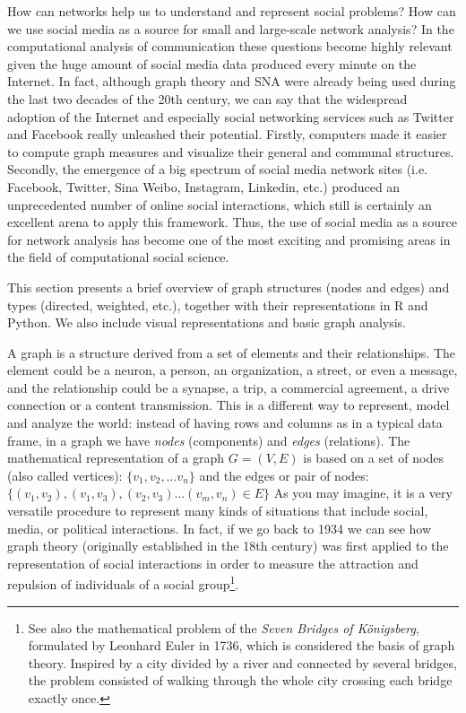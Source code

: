How can networks help us to understand and represent social problems? How can we use social media as a source for small and large-scale network analysis? In the computational analysis of communication these questions become highly relevant given the huge amount of social media data produced every minute on the Internet.  In fact, although graph theory and SNA were already being used during the last two decades of the 20th century, we can say that the widespread adoption of the Internet and especially social networking services such as Twitter and Facebook really unleashed their potential. Firstly, computers made it easier to compute graph measures and visualize their general and communal structures. Secondly, the emergence of a big spectrum of social media network sites (i.e. Facebook, Twitter, Sina Weibo, Instagram, Linkedin, etc.) produced an unprecedented number of online social interactions, which still is certainly an excellent arena to apply this framework. Thus, the use of social media as a source for network analysis has become one of the most exciting and promising areas in the field of computational social science.

This section presents a brief overview of graph structures (nodes and edges) and types (directed, weighted, etc.), together with their representations in R and Python. We also include visual representations and basic graph analysis.

A graph is a structure derived from a set of elements and their relationships. The element could be a neuron, a person, an organization, a street, or even a message, and the relationship could be a synapse, a trip, a commercial agreement, a drive connection or a content transmission. This is a different way to represent, model and analyze the world: instead of having rows and columns as in a typical data frame, in a graph we have \emph{nodes} (components) and \emph{edges} (relations).
The mathematical representation of a graph $G=(V,E)$ is based on a set of nodes (also called vertices): $\{v_{1}, v_{2},\ldots v_{n}\}$ and the edges or pair of nodes: $\{(v_{1}, v_{2}), (v_{1}, v_{3}), (v_{2},v_{3}) \ldots (v_{m}, v_{n}) \in E\}$ As you may imagine, it is a very versatile procedure to represent many kinds of situations that include social, media, or political interactions. In fact, if we go back to 1934 we can see how graph theory (originally established in the 18th century) was first applied to the representation of social interactions \citep{moreno1934shall} in order to measure the attraction and repulsion of individuals of a social group\footnote{See also the mathematical problem of the \emph{Seven Bridges of K\"onigsberg}, formulated by Leonhard Euler in 1736, which is considered the basis of graph theory. Inspired by a city divided by a river and connected by several bridges, the problem consisted of walking through the whole city crossing each bridge exactly once.}.

